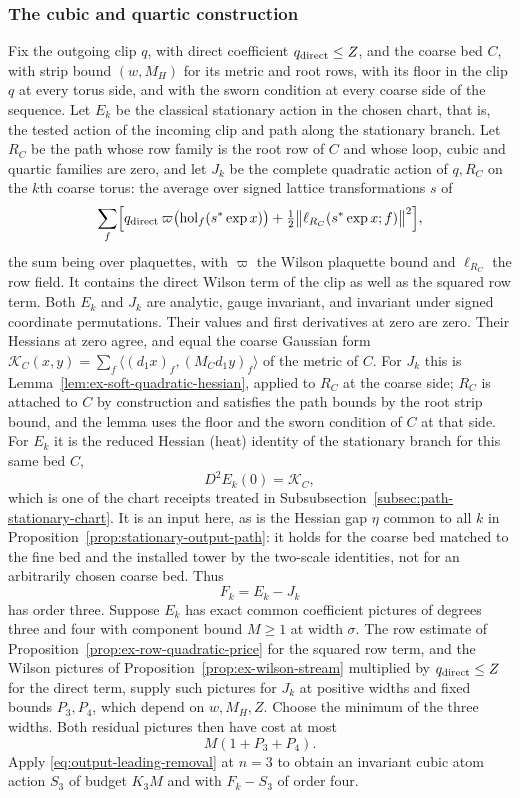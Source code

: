 \subsubsection{The cubic and quartic construction}
Fix the outgoing clip $q$, with direct coefficient
$q_{\rm direct}\leq Z$, and the coarse bed $C$, with strip bound
$(w,M_H)$ for its metric and root rows, with its floor in the clip $q$
at every torus side, and with the sworn condition at every coarse side
of the sequence. Let $E_k$ be the classical stationary action in the
chosen chart, that is, the tested action of the incoming clip and path
along the stationary branch. Let $R_C$ be the path whose row family is
the root row of $C$ and whose loop, cubic and quartic families are
zero, and let $J_k$ be the complete quadratic action of $q,R_C$ on the
$k$th coarse torus: the average over signed lattice transformations
$s$ of
\[
 \sum_f\Bigl[q_{\rm direct}\,\varpi\bigl(\operatorname{hol}_f
      (s^*\exp x)\bigr)
      +\tfrac12\bigl\|\ell_{R_C}(s^*\exp x;f)\bigr\|^2\Bigr],
\]
the sum being over plaquettes, with $\varpi$ the Wilson plaquette
bound and $\ell_{R_C}$ the row field. It contains the direct Wilson
term of the clip as well as the squared row term. Both $E_k$ and $J_k$
are analytic, gauge invariant, and invariant under signed coordinate
permutations. Their values and first derivatives at zero are zero.
Their Hessians at zero agree, and equal the coarse Gaussian form
$\mathcal K_C(x,y)=\sum_f\langle(d_1x)_f,(M_Cd_1y)_f\rangle$ of the
metric of $C$. For $J_k$ this is
Lemma~\ref{lem:ex-soft-quadratic-hessian}, applied to $R_C$ at the
coarse side; $R_C$ is attached to $C$ by construction and satisfies
the path bounds by the root strip bound, and the lemma uses the floor
and the sworn condition of $C$ at that side. For $E_k$ it is the reduced
Hessian (heat) identity of the stationary branch for this same bed
$C$,
\[
 D^2E_k(0)=\mathcal K_C ,
\]
which is one of the chart receipts treated in
Subsubsection~\ref{subsec:path-stationary-chart}. It is an input here, as is
the Hessian gap $\eta$ common to all $k$ in
Proposition~\ref{prop:stationary-output-path}: it
holds for the coarse bed matched to the fine bed and the installed
tower by the two-scale identities, not for an arbitrarily chosen
coarse bed. Thus
\[
                              F_k=E_k-J_k
\]
has order three. Suppose $E_k$ has exact common coefficient
pictures of degrees three and four with component bound $M\ge1$
at width $\sigma$. The row estimate of
Proposition~\ref{prop:ex-row-quadratic-price} for the squared row term,
and the Wilson pictures of Proposition~\ref{prop:ex-wilson-stream}
multiplied by $q_{\rm direct}\leq Z$ for the direct term, supply such
pictures for $J_k$ at positive widths and fixed bounds $P_3,P_4$,
which depend on $w,M_H,Z$.
Choose the minimum of the three widths. Both residual pictures
then have cost at most
\[
                             M(1+P_3+P_4).
\]
Apply \eqref{eq:output-leading-removal} at $n=3$ to obtain an
invariant cubic atom action $S_3$ of budget $K_3M$ and with
$F_k-S_3$ of order four.

